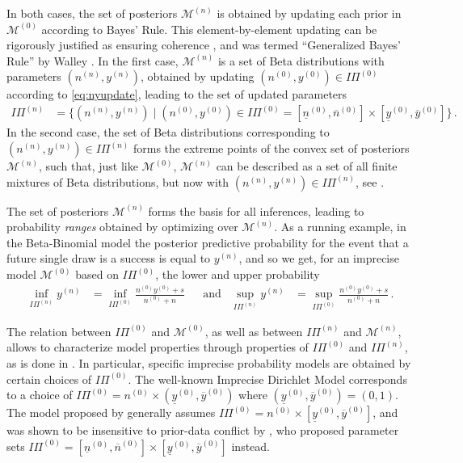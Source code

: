 \documentclass[runningheads,a4paper]{llncs}
\newcommand{\uz}{^{(0)}} %
\newcommand{\un}{^{(n)}} %
\newcommand{\ul}[1]{\underline{#1}}
\newcommand{\ol}[1]{\overline{#1}}
\def\yz{y\uz}
\def\yn{y\un}
\def\yzl{\ul{y}\uz}
\def\yzu{\ol{y}\uz}
\def\nz{n\uz}
\def\nn{n\un}
\def\nzl{\ul{n}\uz}
\def\nzu{\ol{n}\uz}
\def\PZ{I\!\!\Pi\uz}
\def\PN{I\!\!\Pi\un}
\def\MZ{\mathcal{M}\uz}
\def\MN{\mathcal{M}\un}
\begin{document}
In both cases, the set of posteriors $\MN$ is obtained by updating each prior in $\MZ$ according to Bayes' Rule.
This element-by-element updating can be rigorously justified
as ensuring coherence \cite[\S 2.5]{1991:walley}, and was termed ``Generalized Bayes' Rule'' by Walley \cite[\S 6.4]{1991:walley}.
In the first case, $\MN$ is a set of Beta distributions with parameters $(\nn, \yn)$,
obtained by updating $(\nz, \yz) \in \PZ$ according to \eqref{eq:nyupdate},
leading to the set of updated parameters
\begin{align}
\PN &= \Big\{ (\nn, \yn) \mid (\nz, \yz) \in \PZ = [\nzl, \nzu] \times [\yzl, \yzu] \Big\}\,.
\label{eq:paramsets}
\end{align}
In the second case, the set of Beta distributions corresponding to $(\nn, \yn) \in \PN$
forms the extreme points of the convex set of posteriors $\MN$,
such that, just like $\MZ$, $\MN$ can be described as a set of all finite mixtures of Beta distributions,
but now with $(\nn, \yn) \in \PN$, see \cite[pp.~56f]{2013:diss-gw}.

The set of posteriors $\MN$ forms the basis for all inferences,
leading to probability \emph{ranges} obtained by optimizing over $\MN$.
As a running example, in the Beta-Binomial model %
the posterior predictive probability %
for the event that a future single draw is a success is equal to $\yn$, and so we get,
for an imprecise model $\MZ$ based on $\PZ$,
the lower and upper probability
\begin{align*}
\inf_{\PN} \yn &= \inf_{\PZ} \frac{\nz\yz + s}{\nz +n} & &\text{and} &
\sup_{\PN} \yn &= \sup_{\PZ} \frac{\nz\yz + s}{\nz +n}\,.
\end{align*}

The relation between $\PZ$ and $\MZ$, as well as between $\PN$ and $\MN$,
allows to characterize model properties through properties of $\PZ$ and $\PN$,
as is done in \cite[\S 3.1.2 -- 3.1.4]{2013:diss-gw}.
In particular, specific imprecise probability models are obtained by certain choices of $\PZ$.
The well-known Imprecise Dirichlet Model \cite{1996:walley::idm}
corresponds to a choice of $\PZ = \nz \times (\yzl, \yzu)$ where $(\yzl, \yzu) = (0,1)$.
The model proposed by \cite{2005:quaeghebeurcooman} generally assumes $\PZ = \nz \times [\yzl, \yzu]$,
and was shown to be insensitive to prior-data conflict by \cite{Walter2009a},
who proposed parameter sets $\PZ = [\nzl, \nzu] \times [\yzl, \yzu]$ instead.
\end{document}
